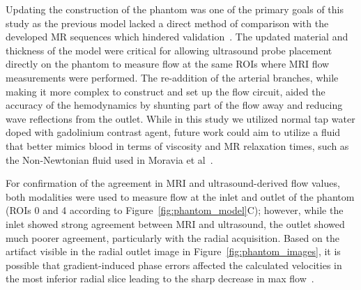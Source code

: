 Updating the construction of the phantom was one of the primary goals of this study as the previous model lacked a direct method of comparison with the developed MR sequences which hindered validation~\cite{robertsAdvancingFunctionalAssessment2023}. The updated material and thickness of the model were critical for allowing ultrasound probe placement directly on the phantom to measure flow at the same ROIs where MRI flow measurements were performed. The re-addition of the arterial branches, while making it more complex to construct and set up the flow circuit, aided the accuracy of the hemodynamics by shunting part of the flow away and reducing wave reflections from the outlet. While in this study we utilized normal tap water doped with gadolinium contrast agent, future work could aim to utilize a fluid that better mimics blood in terms of viscosity and MR relaxation times, such as the Non-Newtonian fluid used in Moravia et al~\cite{moraviaVitroFlowStudy2022}. 

For confirmation of the agreement in MRI and ultrasound-derived flow values, both modalities were used to measure flow at the inlet and outlet of the phantom (ROIs 0 and 4 according to Figure~\ref{fig:phantom_model}C); however, while the inlet showed strong agreement between MRI and ultrasound, the outlet showed much poorer agreement, particularly with the radial acquisition. Based on the artifact visible in the radial outlet image in Figure~\ref{fig:phantom_images}, it is possible that gradient-induced phase errors affected the calculated velocities in the most inferior radial slice leading to the sharp decrease in max flow~\cite{moraviaVitroFlowStudy2022}.

